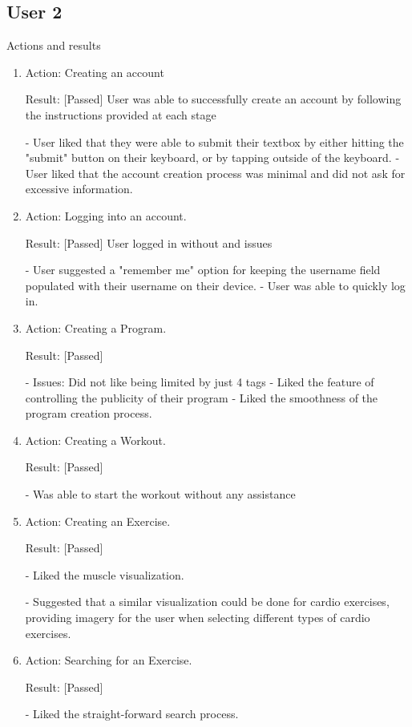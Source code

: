 \documentclass[12pt, titlepage]{article}
\begin{document}
\subsection{User 2}
Actions and results
\begin{enumerate}
	\item Action: Creating an account
	
	Result: [Passed] User was able to successfully create an account by following the instructions provided at each stage
	
	-	User liked that they were able to submit their textbox by either hitting the "submit" button on their keyboard, or by tapping outside of the keyboard.
	-	User liked that the account creation process was minimal and did not ask for excessive information.
	
	\item Action: Logging into an account.
	
	Result: [Passed] User logged in without and issues
	
	-	User suggested a "remember me" option for keeping the username field populated with their username on their device.
	-	User was able to quickly log in.
	
	\item Action: Creating a Program.
	
	Result: [Passed] 
	
	-	Issues: Did not like being limited by just 4 tags
	-	Liked the feature of controlling the publicity of their program
	-	Liked the smoothness of the program creation process.
	
	\item Action: Creating a Workout.
	
	Result: [Passed]
	
	-	Was able to start the workout without any assistance
	
	\item Action: Creating an Exercise.
	
	Result: [Passed]
	
	-	Liked the muscle visualization.
	
	- Suggested that a similar visualization could be done for cardio exercises, providing imagery for the user when selecting different types of cardio exercises.
	
	\item Action: Searching for an Exercise.
	
	Result: [Passed]
	
	- Liked the straight-forward search process.
	

\end{enumerate}
\end{document}
